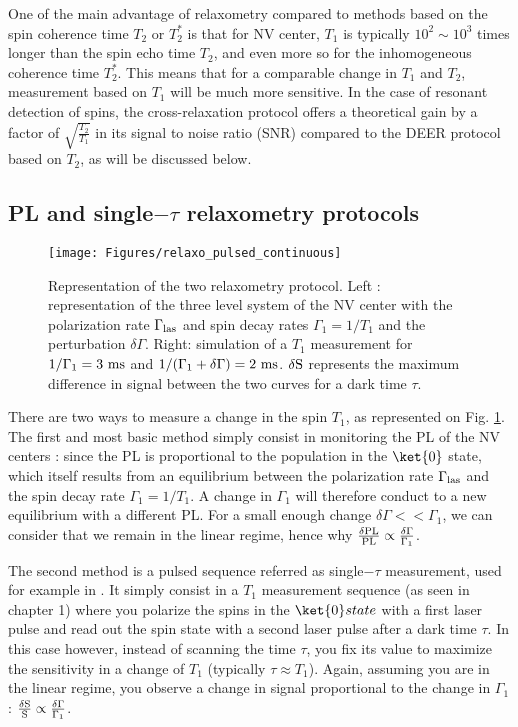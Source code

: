\documentclass[a4paper]{report}
\begin{document}
One of the main advantage of relaxometry compared to methods based on the spin coherence time $T_2$ or $T_2^*$ is that for NV center, $T_1$ is typically $10^2 \sim 10^3$ times longer than the spin echo time $T_2$, and even more so for the inhomogeneous coherence time $T_2^*$. This means that for a comparable change in $T_1$ and $T_2$, measurement based on $T_1$ will be much more sensitive. In the case of resonant detection of spins, the cross-relaxation protocol offers a theoretical gain by a factor of $\sqrt{\frac{T_2}{T_1}}$ \citep{hall2016detection} in its signal to noise ratio (SNR) compared to the DEER protocol based on $T_2$, as will be discussed below.

\subsection{PL and single$-\tau$ relaxometry protocols}
\begin{figure}
\centering
\texttt{[image: Figures/relaxo\_pulsed\_continuous]}
\caption{Representation of the two relaxometry protocol. Left : representation of the three level system of the NV center with the polarization rate $\Gamma_{\rm las}$ and spin decay rates $\Gamma_1=1/T_1$ and the perturbation $\delta \Gamma$. Right: simulation of a $T_1$ measurement for $1/\Gamma_1=3\ \rm ms$ and $1/(\Gamma_1+\delta \Gamma)=2\ \rm ms$. $\delta \rm S$ represents the maximum difference in signal between the two curves for a dark time $\tau$.}
\label{T1 vs PL}
\end{figure}

There are two ways to measure a change in the spin $T_1$, as represented on Fig. \ref{T1 vs PL}. The first and most basic method simply consist in monitoring the PL of the NV centers : since the PL is proportional to the population in the $\ket{0}$ state, which itself results from an equilibrium between the polarization rate $\Gamma_{\rm las}$ and the spin decay rate $\Gamma_1=1/T_1$. A change in $\Gamma_1$ will therefore conduct to a new equilibrium with a different PL. For a small enough change $\delta \Gamma << \Gamma_1$, we can consider that we remain in the linear regime, hence why $\frac{\delta \rm PL}{\rm PL} \propto \frac{\delta \Gamma}{\Gamma_1}$.

The second method is a pulsed sequence referred as single$-\tau$ measurement, used for example in \citep{pelliccione2014two, schmid2015relaxometry, tetienne2016scanning}. It simply consist in a $T_1$ measurement sequence (as seen in chapter 1) where you polarize the spins in the $\ket{0} state$ with a first laser pulse and read out the spin state with a second laser pulse after a dark time $\tau$. In this case however, instead of scanning the time $\tau$, you fix its value to maximize the sensitivity in a change of $T_1$ (typically $\tau \approx T_1$). Again, assuming you are in the linear regime, you observe a change in signal proportional to the change in $\Gamma_1$ : $\frac{\delta \rm S}{\rm S} \propto \frac{\delta \Gamma}{\Gamma_1}$.
\end{document}
